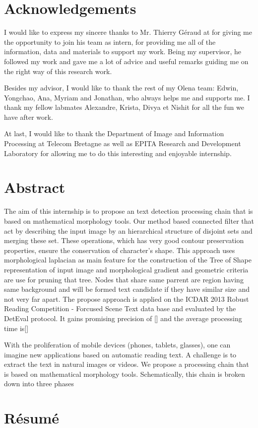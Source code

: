 \graphicspath{ {0TitlePage/title/} }
\section{Acknowledgements}
I would like to express my sincere thanks to Mr. Thierry Géraud at for giving me the opportunity to join his team as intern, for providing me all of the information, data and materials to support my work. Being my supervisor, he followed my work and gave me a lot of advice and useful remarks guiding me on the right way of this research work.

Besides my advisor, I would like to thank the rest of my Olena team: Edwin, Yongchao, Ana, Myriam and Jonathan, who always helps me and supports me. I thank my fellow labmates Alexandre, Krista, Divya et Nishit for all the fun we have after work.

At last, I would like to thank the Department of Image and Information Processing at Telecom Bretagne as well as EPITA Research and Development Laboratory for allowing me to do this interesting and enjoyable internship. 

\section{Abstract}
The aim of this internship is to propose an text detection processing chain that is based on mathematical morphology tools. Our method based connected filter that act by describing the input image by an hierarchical structure of disjoint sets and merging these set. These operations, which has very good contour preservation properties, ensure the conservation of character's shape. This approach uses morphological laplacian as main feature for the construction of the Tree of Shape representation of input image and morphological gradient and geometric criteria are use for pruning that tree. Nodes that share same parrent are region having same background and will be formed text candidate if they have similar size and not very far apart. The propose approach is applied on the ICDAR 2013 Robust Reading Competition - Forcused Scene Text data base and evaluated by the DetEval protocol. It gains promising precision of [] and the average processing time is[]


With the proliferation of mobile devices (phones, tablets, glasses), one can imagine new applications based on automatic reading text. A challenge is to extract the text in natural images or videos.
We propose a processing chain that is based on mathematical morphology tools. Schematically, this chain is broken down into three phases
\section{Résumé}
